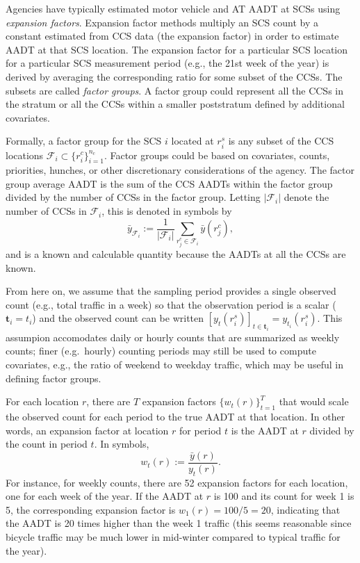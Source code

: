 \documentclass[11pt]{article}
\begin{document}
Agencies have typically estimated motor vehicle and AT AADT at SCSs
using \emph{expansion factors}. Expansion factor methods multiply an SCS
count by a constant estimated from CCS data (the expansion factor) in
order to estimate AADT at that SCS location. The expansion factor for a
particular SCS location for a particular SCS measurement period (e.g.,
the 21st week of the year) is derived by averaging the corresponding
ratio for some subset of the CCSs. The subsets are called \emph{factor
groups}. A factor group could represent all the CCSs in the stratum or
all the CCSs within a smaller poststratum defined by additional
covariates.

Formally, a factor group for the SCS \(i\) located at \(r_i^s\) is any
subset of the CCS locations
\(\mathcal{F}_i \subset \{r^c_i\}_{i=1}^{n_c}\). Factor groups could be
based on covariates, counts, priorities, hunches, or other discretionary
considerations of the agency. The factor group average AADT is the sum
of the CCS AADTs within the factor group divided by the number of CCSs
in the factor group. Letting \(|\mathcal{F}_i|\) denote the number of
CCSs in \(\mathcal{F}_i\), this is denoted in symbols by
\[\bar{y}_{\mathcal{F}_i} := \frac{1}{|\mathcal{F}_i|} \sum_{r_j^c \in \mathcal{F}_i} \bar{y}(r_j^c),\]
and is a known and calculable quantity because the AADTs at all the CCSs
are known.

From here on, we assume that the sampling period provides a single
observed count (e.g., total traffic in a week) so that the observation
period is a scalar (\(\mathbf{t}_i = t_i\)) and the observed count can
be written \([y_t(r_i^s)]_{t \in \mathbf{t}_i} = y_{t_i}(r_i^s)\). This
assumpion accomodates daily or hourly counts that are summarized as
weekly counts; finer (e.g.~hourly) counting periods may still be used to
compute covariates, e.g., the ratio of weekend to weekday traffic, which
may be useful in defining factor groups.

For each location \(r\), there are \(T\) expansion factors
\(\{w_t(r)\}_{t=1}^T\) that would scale the observed count for each
period to the true AADT at that location. In other words, an expansion
factor at location \(r\) for period \(t\) is the AADT at \(r\) divided
by the count in period \(t\). In symbols,
\[w_t(r) := \frac{\bar{y}(r)}{y_t(r)}.\] For instance, for weekly
counts, there are 52 expansion factors for each location, one for each
week of the year. If the AADT at \(r\) is 100 and its count for week 1
is 5, the corresponding expansion factor is \(w_1(r) = 100/5 = 20\),
indicating that the AADT is 20 times higher than the week 1 traffic
(this seems reasonable since bicycle traffic may be much lower in
mid-winter compared to typical traffic for the year).
\end{document}
